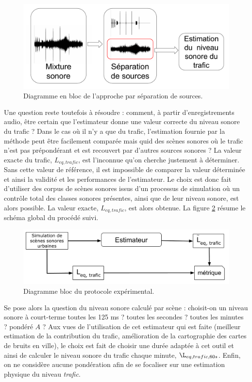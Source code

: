 \begin{figure}[t]
\centering
\includegraphics[width=0.7\linewidth]{./figures/NMF/bloc_diagram_source_separation.pdf}
\caption{Diagramme en bloc de l'approche par séparation de sources.}
\label{fig:separation_source}
\end{figure}

Une question reste toutefois à résoudre : comment, à partir d'enregistrements audio, être certain que l'estimateur donne une valeur correcte du niveau sonore du trafic ? Dans le cas où il n'y a que du trafic, l'estimation fournie par la méthode peut être facilement comparée mais quid des scènes sonores où le trafic n'est pas prépondérant et est recouvert par d'autres sources sonores ? La valeur exacte du trafic, $L_{eq,trafic}$, est l'inconnue qu'on cherche justement à déterminer. Sans cette valeur de référence, il est impossible de comparer la valeur déterminée et ainsi la validité et les performances de l'estimateur.
Le choix est donc fait d'utiliser des corpus de scènes sonores issus d'un processus de simulation où un contrôle total des classes sonores présentes, ainsi que de leur niveau sonore, est alors possible. La valeur exacte, $L_{eq,trafic}$, est alors obtenue. La figure \ref{fig:diagramBlocProtocol} résume le schéma global du procédé suivi.

\begin{figure}[t]
\centering
\includegraphics[width=0.7\linewidth]{./figures/NMF/Bloc_diagram_estimateur_FR.pdf}
\caption{Diagramme bloc du protocole expérimental.}
\label{fig:diagramBlocProtocol}
\end{figure}

Se pose alors la question du niveau sonore calculé par scène : choisit-on un niveau sonore à court-terme toutes les 125 ms ? toutes les secondes ? toutes les minutes ? pondéré $A$ ? Aux vues de l'utilisation de cet estimateur qui est faite (meilleur estimation de la contribution du trafic, amélioration de la cartographie des cartes de bruits en ville), le choix est fait de choisir une durée adaptée à cet outil et ainsi de calculer le niveau sonore du trafic chaque minute, $\L_{eq,trafic,60s}$. Enfin, on ne  considère aucune pondération afin de se focaliser sur une estimation physique du niveau \textit{trafic}.\\

